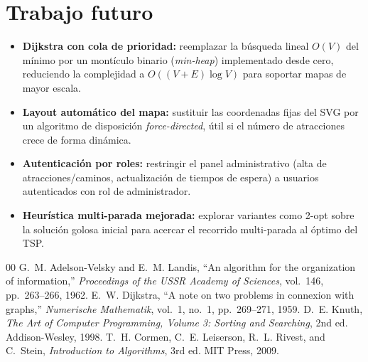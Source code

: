 \documentclass[conference]{IEEEtran}
\begin{document}
\section{Trabajo futuro}

\begin{itemize}
  \item \textbf{Dijkstra con cola de prioridad:} reemplazar la b\'usqueda
    lineal $O(V)$ del m\'inimo por un mont\'iculo binario (\emph{min-heap})
    implementado desde cero, reduciendo la complejidad a
    $O((V+E)\log V)$ para soportar mapas de mayor escala.
  \item \textbf{Layout autom\'atico del mapa:} sustituir las coordenadas fijas
    del SVG por un algoritmo de disposici\'on \emph{force-directed}, \'util si
    el n\'umero de atracciones crece de forma din\'amica.
  \item \textbf{Autenticaci\'on por roles:} restringir el panel
    administrativo (alta de atracciones/caminos, actualizaci\'on de tiempos
    de espera) a usuarios autenticados con rol de administrador.
  \item \textbf{Heur\'istica multi-parada mejorada:} explorar variantes como
    2-opt sobre la soluci\'on golosa inicial para acercar el recorrido
    multi-parada al \'optimo del TSP.
\end{itemize}

\begin{thebibliography}{00}
 G.~M. Adelson-Velsky and E.~M. Landis, ``An algorithm
  for the organization of information,'' \emph{Proceedings of the USSR
  Academy of Sciences}, vol.~146, pp.~263--266, 1962.
 E.~W. Dijkstra, ``A note on two problems in connexion
  with graphs,'' \emph{Numerische Mathematik}, vol.~1, no.~1,
  pp.~269--271, 1959.
 D.~E. Knuth, \emph{The Art of Computer Programming,
  Volume 3: Sorting and Searching}, 2nd ed. Addison-Wesley, 1998.
 T.~H. Cormen, C.~E. Leiserson, R.~L. Rivest, and
  C.~Stein, \emph{Introduction to Algorithms}, 3rd ed. MIT Press, 2009.
\end{thebibliography}
\end{document}
